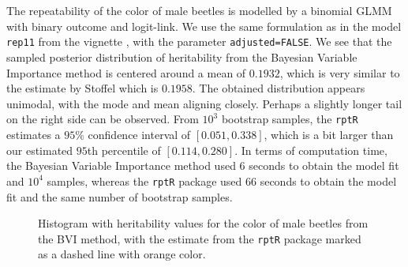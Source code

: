 \\
\\
The repeatability of the color of male beetles is modelled by a binomial GLMM with binary outcome and logit-link. We use the same formulation as in the model \texttt{rep11} from the vignette \citep{Stoffel2017rptR}, with the parameter \texttt{adjusted=FALSE}. We see that the sampled posterior distribution of heritability  from the Bayesian Variable Importance method is centered around a mean of $0.1932$, which is very similar to the estimate by Stoffel which is $0.1958$. The obtained distribution appears unimodal, with the mode and mean aligning closely. Perhaps a slightly longer tail on the right side can be observed. From $10^3$ bootstrap samples, the \texttt{rptR} estimates a $95\%$ confidence interval of $[0.051, 0.338]$, which is a bit larger than our estimated $95$th percentile of $[0.114, 0.280]$. In terms of computation time, the Bayesian Variable Importance method used $6$ seconds to obtain the model fit and $10^4$ samples, whereas the \texttt{rptR} package used $66$ seconds to obtain the model fit and the same number of bootstrap samples.
\begin{figure}[H]
  \centering
  \caption[Estimated repeatability of color in male beetles]{Histogram with heritability values for the color of male beetles from the BVI method, with the estimate from the \texttt{rptR} package marked as a dashed line with orange color.}
\end{figure}
